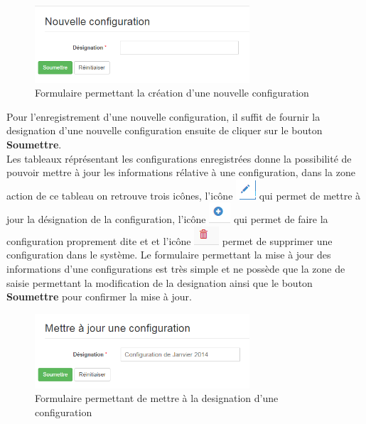 \documentclass[12pt,a4paper]{report}
\begin{document}
\begin{figure}[h]
\begin{center}
\includegraphics[width=8cm]{pic/NouvConfigT.png}
\end{center}
\caption{Formulaire permettant la création d'une nouvelle configuration}
\label{Formulaire permettant la création d'une nouvelle configuration}
\end{figure} 

\newpage
Pour l'enregistrement d'une nouvelle configuration, il suffit de fournir la designation d'une nouvelle configuration ensuite de cliquer sur le bouton \textbf{Soumettre}.
\\

Les tableaux réprésentant les configurations enregistrées donne la possibilité de pouvoir mettre à jour les informations rélative à une configuration, dans la zone action de ce tableau on retrouve trois icônes, l'icône \includegraphics[scale=0.7]{pic/EditUser.png} qui permet de mettre à jour la désignation de la configuration, l'icône  \includegraphics[scale=0.7]{pic/PlusConfigBlue.png} qui permet de faire la configuration proprement dite et  et l'icône  \includegraphics[scale=0.7]{pic/DeleteWRed.png} permet de supprimer une configuration dans le système.
Le formulaire permettant la mise à jour des informations d'une configurations est très simple et ne possède que la zone de saisie permettant la modification de la designation ainsi que le bouton \textbf{Soumettre} pour confirmer la mise à jour.

\begin{figure}[h]
\begin{center}
\includegraphics[width=8cm]{pic/UpDConfgTax.png}
\end{center}
\caption{Formulaire permettant de mettre à la designation d'une configuration}
\label{Formulaire permettant de mettre à la designation d'une configuration}
\end{figure} 
\end{document}
